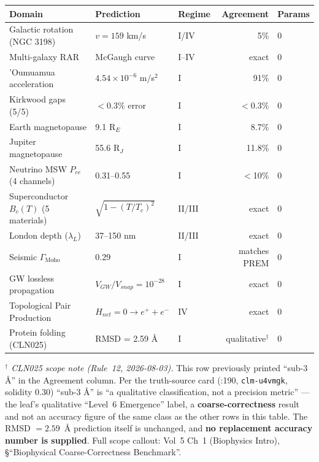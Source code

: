 \begin{center}
\small
\begin{tabularx}{\textwidth}{@{}l l l r X@{}}
\toprule
\textbf{Domain} & \textbf{Prediction} & \textbf{Regime} & \textbf{Agreement} & \textbf{Params} \\
\midrule
Galactic rotation (NGC 3198)  & $v = 159$ km/s         & I/IV  & 5\%    & 0 \\
Multi-galaxy RAR              & McGaugh curve           & I--IV & exact  & 0 \\
'Oumuamua acceleration        & $4.54 \times 10^{-6}$ m/s$^2$ & I & 91\%   & 0 \\
Kirkwood gaps (5/5)           & $< 0.3\%$ error         & I     & $<$0.3\% & 0 \\
Earth magnetopause            & 9.1 R$_E$               & I     & 8.7\%  & 0 \\
Jupiter magnetopause          & 55.6 R$_J$              & I     & 11.8\% & 0 \\
Neutrino MSW $P_{ee}$ (4 channels) & 0.31--0.55        & I     & $<$10\% & 0 \\
Superconductor $B_c(T)$ (5 materials) & $\sqrt{1-(T/T_c)^2}$ & II/III & exact & 0 \\
London depth ($\lambda_L$)    & 37--150 nm             & II/III & exact  & 0 \\
Seismic $\Gamma_{\text{Moho}}$ & 0.29                  & I     & matches PREM & 0 \\
GW lossless propagation       & $V_{GW}/V_{snap} = 10^{-28}$ & I & exact & 0 \\
Topological Pair Production   & $H_{net}=0 \to e^+ + e^-$    & IV    & exact & 0 \\
Protein folding (CLN025)      & RMSD = 2.59 \AA        & I     & qualitative$^{\dagger}$ & 0 \\
\bottomrule
\end{tabularx}
\end{center}

\noindent\emph{$^{\dagger}$ CLN025 scope note (Rule~12, 2026-08-03).} This row
previously printed ``sub-3 \AA'' in the Agreement column. Per the truth-source
card (:190,
\texttt{clm-u4vmgk}, solidity 0.30) ``sub-3 \AA'' is
``a qualitative classification, not a precision metric'' --- the leaf's
qualitative ``Level~6 Emergence'' label, a \textbf{coarse-correctness} result
and not an accuracy figure of the same
class as the other rows in this table. The RMSD $= 2.59$~\AA{} prediction
itself is unchanged, and \textbf{no replacement accuracy number is supplied}.
Full scope callout: Vol~5 Ch~1 (Biophysics Intro),
\S``Biophysical Coarse-Correctness Benchmark''.

